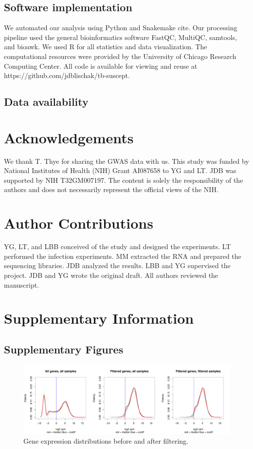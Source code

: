 \documentclass[fleqn,10pt]{wlscirep}
\newcommand{\beginsupplement}{%
 \setcounter{table}{0}
 \renewcommand{\thetable}{S\arabic{table}}%
 \setcounter{figure}{0}
 \renewcommand{\thefigure}{S\arabic{figure}}%
 }
\begin{document}
\subsection*{Software implementation}

We automated our analysis using Python and Snakemake cite. Our processing pipeline used the general bioinformatics software FastQC, MultiQC, samtools, and bioawk. We used R for all statistics and data visualization. The computational resources were provided by the University of Chicago Research Computing Center. All code is available for viewing and reuse at https://github.com/jdblischak/tb-suscept.
\subsection*{Data availability}

\section*{Acknowledgements}

We thank T. Thye for sharing the GWAS data with us. This study was funded by National Institutes of Health (NIH) Grant AI087658 to YG and LT. JDB was supported by NIH T32GM007197. The content is solely the responsibility of the authors and does not necessarily represent the official views of the NIH.
\section*{Author Contributions}

YG, LT, and LBB conceived of the study and designed the experiments. LT performed the infection experiments. MM extracted the RNA and prepared the sequencing libraries. JDB analyzed the results. LBB and YG supervised the project. JDB and YG wrote the original draft. All authors reviewed the manuscript.




\clearpage\newpage
\beginsupplement
\section*{Supplementary Information}

\subsection*{Supplementary Figures}


\begin{figure}[ht]
\centering
\includegraphics[width=\linewidth]{../figure/gene-exp-distribution.pdf}
\caption{
Gene expression distributions before and after filtering.
}
\label{fig:gene}
\end{figure}
\end{document}
